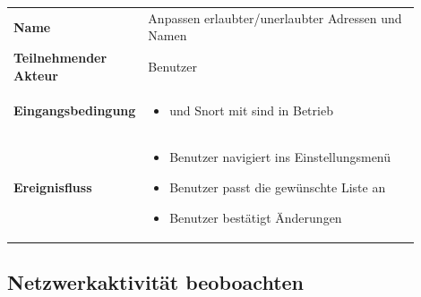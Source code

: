 \begin{tabular}{lp{0.9\linewidth}}

\textbf{Name} & Anpassen erlaubter/unerlaubter Adressen und Namen \\

\textbf{Teilnehmender Akteur} & Benutzer \\

\textbf{Eingangsbedingung} &
				\begin{minipage}[t]{\linewidth}
				\begin{itemize}[nosep,after=\strut,leftmargin=10pt]

				\item \programname und Snort mit \sppname sind in Betrieb

				\end{itemize}
				\end{minipage} \\
\textbf{Ereignisfluss} &
				\begin{minipage}[t]{\linewidth}
				\begin{itemize}[nosep,after=\strut,leftmargin=10pt]

				\item Benutzer navigiert ins Einstellungsmenü
				\item Benutzer passt die gewünschte Liste an
				\item Benutzer bestätigt Änderungen

				\end{itemize}
				\end{minipage} \\

\end{tabular}

\subsection{Netzwerkaktivität beoboachten}

